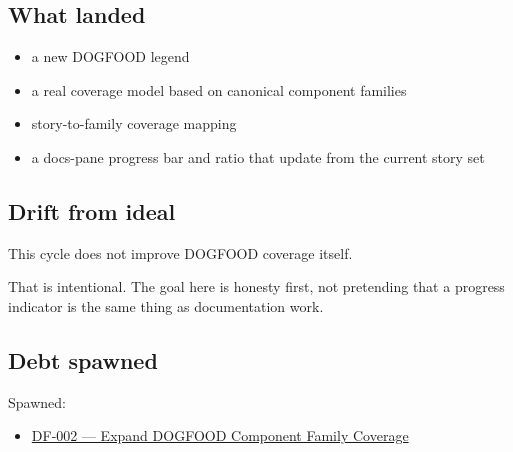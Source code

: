 \subsection{What landed}\label{record-064-what-landed}

\begin{itemize}
\tightlist
\item
  a new DOGFOOD legend
\item
  a real coverage model based on canonical component families
\item
  story-to-family coverage mapping
\item
  a docs-pane progress bar and ratio that update from the current story set
\end{itemize}

\subsection{Drift from ideal}\label{record-064-drift-from-ideal}

This cycle does not improve DOGFOOD coverage itself.

That is intentional. The goal here is honesty first, not pretending that a progress indicator is the same thing as documentation work.

\subsection{Debt spawned}\label{record-064-debt-spawned}

Spawned:

\begin{itemize}
\tightlist
\item
  \href{https://github.com/flyingrobots/bijou/blob/cbd70612140e7a450d764b3c7be1c6af878b99bc/docs/method/graveyard/legacy-backlog/DF-002-expand-dogfood-component-family-coverage.md}{DF-002 --- Expand DOGFOOD Component Family Coverage}
\end{itemize}


